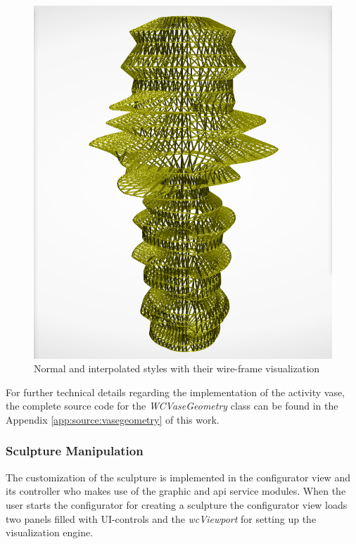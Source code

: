\documentclass[../medieninformatik-arbeit.tex]{subfiles}
\begin{document}
\begin{figure}[t!]
\begin{minipage}{.225\textwidth}
\end{minipage}
\begin{minipage}{.225\textwidth}
\centering
  \includegraphics[width=\linewidth]{Configurator/img/sculpture-2w}
\end{minipage}
\caption{\protect Normal and interpolated styles with their wire-frame visualization}
\label{fig:sculpture styles}
\end{figure}

For further technical details regarding the implementation of the activity vase, the complete source code for the \textit{WCVaseGeometry} class can be found in the Appendix \ref{app:source:vasegeometry} of this work.

\subsubsection{Sculpture Manipulation}
\label{sub:sculpturegeneration}
The customization of the sculpture is implemented in the configurator view and its controller who makes use of the graphic and api service modules. When the user starts the configurator for creating a sculpture the configurator view loads two panels filled with UI-controls and the \textit{wcViewport} for setting up the visualization engine. 
\end{document}
